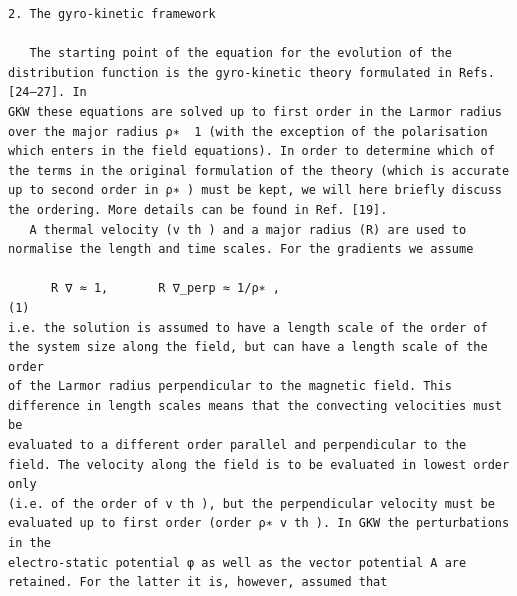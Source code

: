 \documentclass[a4paper]{article}
\newcommand{\gkwpagefont}{\fontsize{6.0pt}{7.55pt}\selectfont}
\begin{document}
\begin{Verbatim}[fontsize=\gkwpagefont]
2. The gyro-kinetic framework

   The starting point of the equation for the evolution of the distribution function is the gyro-kinetic theory formulated in Refs. [24–27]. In
GKW these equations are solved up to first order in the Larmor radius over the major radius ρ∗  1 (with the exception of the polarisation
which enters in the field equations). In order to determine which of the terms in the original formulation of the theory (which is accurate
up to second order in ρ∗ ) must be kept, we will here briefly discuss the ordering. More details can be found in Ref. [19].
   A thermal velocity (v th ) and a major radius (R) are used to normalise the length and time scales. For the gradients we assume

      R ∇ ≈ 1,       R ∇_perp ≈ 1/ρ∗ ,                                                                                                                      (1)
i.e. the solution is assumed to have a length scale of the order of the system size along the field, but can have a length scale of the order
of the Larmor radius perpendicular to the magnetic field. This difference in length scales means that the convecting velocities must be
evaluated to a different order parallel and perpendicular to the field. The velocity along the field is to be evaluated in lowest order only
(i.e. of the order of v th ), but the perpendicular velocity must be evaluated up to first order (order ρ∗ v th ). In GKW the perturbations in the
electro-static potential φ as well as the vector potential A are retained. For the latter it is, however, assumed that


\end{Verbatim}
\end{document}
